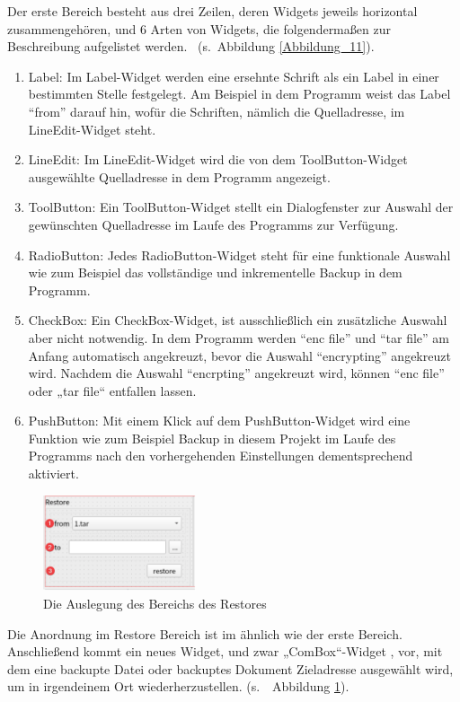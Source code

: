 Der erste Bereich besteht aus drei Zeilen, deren Widgets jeweils horizontal zusammengehören, und 6 Arten von Widgets, die folgendermaßen zur Beschreibung aufgelistet werden.  (s. Abbildung \ref{Abbildung_11}).
\begin{enumerate}
	\item Label: Im Label-Widget werden eine ersehnte Schrift als ein Label in einer bestimmten Stelle festgelegt. Am Beispiel in dem Programm weist das Label ``from'' darauf hin, wofür die Schriften, nämlich die Quelladresse, im LineEdit-Widget steht.  
	\item LineEdit: Im LineEdit-Widget wird die von dem ToolButton-Widget ausgewählte Quelladresse in dem Programm angezeigt.
	\item ToolButton: Ein ToolButton-Widget stellt ein Dialogfenster zur Auswahl der gewünschten Quelladresse im Laufe des Programms zur Verfügung. 
	\item RadioButton: Jedes RadioButton-Widget steht für eine funktionale Auswahl wie zum Beispiel das vollständige und inkrementelle Backup in dem Programm.
	\item CheckBox: Ein CheckBox-Widget, ist ausschließlich ein zusätzliche Auswahl aber nicht notwendig. In dem Programm werden ``enc file'' und ``tar file'' am Anfang automatisch angekreuzt, bevor die Auswahl ``encrypting'' angekreuzt wird. Nachdem die Auswahl ``encrpting'' angekreuzt wird, können ``enc file'' oder „tar file“ entfallen lassen. 
	\item PushButton: Mit einem Klick auf dem PushButton-Widget wird eine Funktion wie zum Beispiel Backup in diesem Projekt im Laufe des Programms nach den vorhergehenden Einstellungen dementsprechend aktiviert. 
\end{enumerate}

\begin{figure}[h!]
	\centering
	\includegraphics[width=0.4\textwidth]{bilder/man_restore.png}
	\caption{Die Auslegung des Bereichs des Restores }
	\label{Abbildung_12}
\end{figure}
Die Anordnung im Restore Bereich ist im ähnlich wie der erste Bereich. Anschließend kommt ein neues Widget, und zwar „ComBox“-Widget , vor, mit dem eine backupte Datei oder backuptes Dokument Zieladresse ausgewählt wird, um in irgendeinem Ort wiederherzustellen. (s.  Abbildung \ref{Abbildung_12}).


